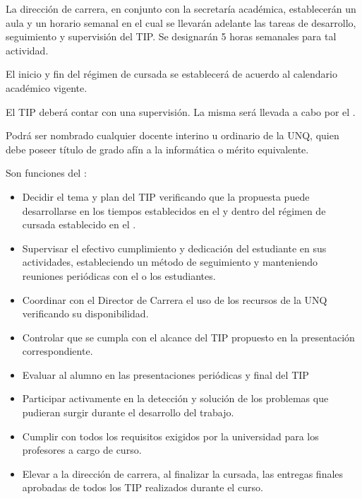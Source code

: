 \articulo La dirección de carrera, en conjunto con la secretaría académica,
establecerán un aula y un horario semanal en el cual se llevarán adelante las
tareas de desarrollo, seguimiento y supervisión del TIP. Se designarán 5 horas
semanales para tal actividad.

\articulo El inicio y fin del régimen de cursada se establecerá de acuerdo al
calendario académico vigente. 


\articulo El TIP deberá contar con una supervisión. La misma será llevada a
cabo por el \profesorTIP{}. 

\articulo Podrá ser nombrado \profesorTIP{} cualquier docente interino u
ordinario de la UNQ, quien debe poseer título de grado afín a la informática o
mérito equivalente.

\articulo Son funciones del \profesorTIP{}:
\begin{itemize}
 \item Decidir el tema y plan del TIP verificando que la
 propuesta puede desarrollarse en los tiempos establecidos en el
 \artHoras y dentro del régimen de cursada establecido en el \artRegimen.
 \item Supervisar el efectivo cumplimiento y dedicación del estudiante en
 sus actividades, estableciendo un método de seguimiento y
 manteniendo reuniones periódicas con el o los estudiantes.
 \item Coordinar con el Director de Carrera el uso de los recursos de la
 UNQ verificando su disponibilidad.
 \item Controlar que se cumpla con el alcance del TIP propuesto en la
 presentación correspondiente.
 \item Evaluar al alumno en las presentaciones periódicas y final del TIP
 \item Participar activamente en la detección y solución de los problemas
 que pudieran surgir durante el desarrollo del trabajo.
 \item Cumplir con todos los requisitos exigidos por la universidad para los
 profesores a cargo de curso.
 \item Elevar a la dirección de carrera, al finalizar la cursada, las entregas
 finales aprobadas de todos los TIP realizados durante el curso.
\end{itemize}


